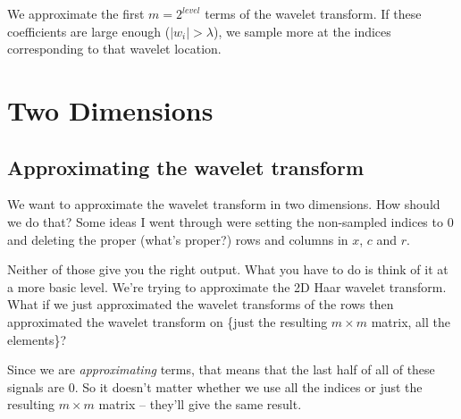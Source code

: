 \documentclass{article}
\begin{document}
        We approximate the first $m=2^{level}$ terms of the wavelet transform. If these coefficients are large enough ($|w_i|> \lambda$), we sample more at the indices corresponding to that wavelet location.


    \section{Two Dimensions}
            


            
        \subsection{Approximating the wavelet transform}
            We want to approximate the wavelet transform in two dimensions. How should we do that? Some ideas I went through were
                setting the non-sampled indices to 0 and
                deleting the proper (what's proper?) rows and columns in $x$, $c$ and $r$.

            Neither of those give you the right output. What you have to do is think of it at a more basic level. We're trying to approximate the 2D Haar wavelet transform. What if we just approximated the wavelet transforms of the rows then approximated the wavelet transform on \{just the resulting $m\times m$ matrix, all the elements\}?

            Since we are \textit{approximating} terms, that means that the last half of all of these signals are 0. So it doesn't matter whether we use all the indices or just the resulting $m \times m$ matrix -- they'll give the same result.
\end{document}
